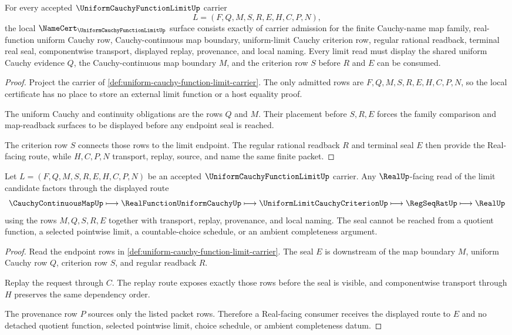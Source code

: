 \begin{theorem}\label{thm:uniform-cauchy-function-limit-namecert-obligations}
For every accepted $\UniformCauchyFunctionLimitUp$ carrier
$$
L=(F,Q,M,S,R,E,H,C,P,N),
$$
the local $\NameCert_{\UniformCauchyFunctionLimitUp}$ surface consists exactly of carrier admission for the finite Cauchy-name map family, real-function uniform Cauchy row, Cauchy-continuous map boundary, uniform-limit Cauchy criterion row, regular rational readback, terminal real seal, componentwise transport, displayed replay, provenance, and local naming. Every limit read must display the shared uniform Cauchy evidence $Q$, the Cauchy-continuous map boundary $M$, and the criterion row $S$ before $R$ and $E$ can be consumed.
\end{theorem}
\begin{proof}
Project the carrier of \autoref{def:uniform-cauchy-function-limit-carrier}. The only admitted rows are $F,Q,M,S,R,E,H,C,P,N$, so the local certificate has no place to store an external limit function or a host equality proof.

The uniform Cauchy and continuity obligations are the rows $Q$ and $M$. Their placement before $S,R,E$ forces the family comparison and map-readback surfaces to be displayed before any endpoint seal is reached.

The criterion row $S$ connects those rows to the limit endpoint. The regular rational readback $R$ and terminal seal $E$ then provide the Real-facing route, while $H,C,P,N$ transport, replay, source, and name the same finite packet.
\end{proof}

\begin{theorem}\label{thm:uniform-cauchy-function-limit-real-seal}
Let $L=(F,Q,M,S,R,E,H,C,P,N)$ be an accepted $\UniformCauchyFunctionLimitUp$ carrier. Any $\RealUp$-facing read of the limit candidate factors through the displayed route
$$
\CauchyContinuousMapUp \longmapsto \RealFunctionUniformCauchyUp \longmapsto \UniformLimitCauchyCriterionUp \longmapsto \RegSeqRatUp \longmapsto \RealUp
$$
using the rows $M,Q,S,R,E$ together with transport, replay, provenance, and local naming. The seal cannot be reached from a quotient function, a selected pointwise limit, a countable-choice schedule, or an ambient completeness argument.
\end{theorem}
\begin{proof}
Read the endpoint rows in \autoref{def:uniform-cauchy-function-limit-carrier}. The seal $E$ is downstream of the map boundary $M$, uniform Cauchy row $Q$, criterion row $S$, and regular readback $R$.

Replay the request through $C$. The replay route exposes exactly those rows before the seal is visible, and componentwise transport through $H$ preserves the same dependency order.

The provenance row $P$ sources only the listed packet rows. Therefore a Real-facing consumer receives the displayed route to $E$ and no detached quotient function, selected pointwise limit, choice schedule, or ambient completeness datum.
\end{proof}


